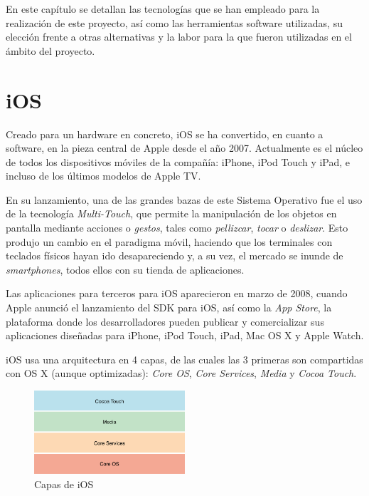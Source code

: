 En este capítulo se detallan las tecnologías que se han empleado para la realización de este proyecto, así como las herramientas software utilizadas, su elección frente a otras alternativas y la labor para la que fueron utilizadas en el ámbito del proyecto.

\section{iOS}
Creado para un hardware en concreto, iOS se ha convertido, en cuanto a software, en la pieza central de Apple desde el año 2007. Actualmente es el núcleo de todos los dispositivos móviles de la compañía: iPhone, iPod Touch y iPad, e incluso de los últimos modelos de Apple TV.

En su lanzamiento, una de las grandes bazas de este Sistema Operativo fue el uso de la tecnología \emph{Multi-Touch}, que permite la manipulación de los objetos en pantalla mediante acciones o \emph{gestos}, tales como \emph{pellizcar}, \emph{tocar} o \emph{deslizar}. Esto produjo un cambio en el paradigma móvil, haciendo que los terminales con teclados físicos hayan ido desapareciendo y, a su vez, el mercado se inunde de \emph{smartphones}, todos ellos con su tienda de aplicaciones.

Las aplicaciones para terceros para iOS aparecieron en marzo de 2008, cuando Apple anunció el lanzamiento del SDK para iOS, así como la \emph{App Store}, la plataforma donde los desarrolladores pueden publicar y comercializar sus aplicaciones diseñadas para iPhone, iPod Touch, iPad, Mac OS X y Apple Watch.

iOS usa una arquitectura en 4 capas, de las cuales las 3 primeras son compartidas con OS X (aunque optimizadas): \emph{Core OS}, \emph{Core Services}, \emph{Media} y \emph{Cocoa Touch}.

\begin{figure}[h]
	\centering
		\includegraphics[width=0.5\textwidth]{./img/ios-layers.png}
	\caption{Capas de iOS}
\end{figure}

